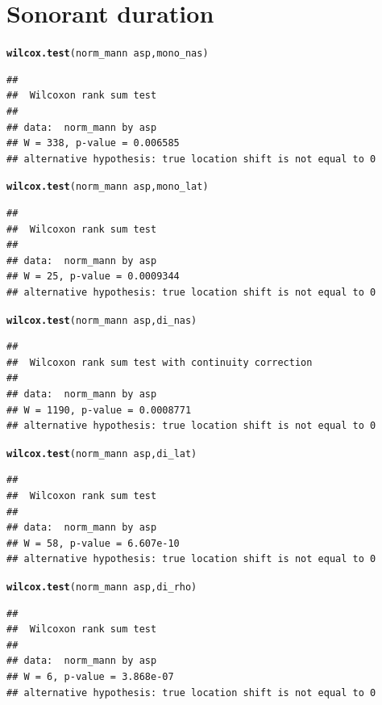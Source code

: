 \documentclass[a4paper,11pt]{article}\usepackage[]{graphicx}\usepackage[]{color}
\makeatletter
\newcommand{\hlopt}[1]{\textcolor[rgb]{0,0,0}{#1}}%
\newcommand{\hlstd}[1]{\textcolor[rgb]{0.345,0.345,0.345}{#1}}%
\newcommand{\hlkwd}[1]{\textcolor[rgb]{0.737,0.353,0.396}{\textbf{#1}}}%
\newenvironment{kframe}{%
 \def\at@end@of@kframe{}%
 \ifinner\ifhmode%
  \def\at@end@of@kframe{\end{minipage}}%
  \begin{minipage}{\columnwidth}%
 \fi\fi%
 \def\FrameCommand##1{\hskip\@totalleftmargin \hskip-\fboxsep
 \colorbox{shadecolor}{##1}\hskip-\fboxsep
     \hskip-\linewidth \hskip-\@totalleftmargin \hskip\columnwidth}%
 \MakeFramed {\advance\hsize-\width
   \@totalleftmargin\z@ \linewidth\hsize
   \@setminipage}}%
 {\par\unskip\endMakeFramed%
 \at@end@of@kframe}
\newenvironment{knitrout}{}{} %
\makeatother
\begin{document}
\section{Sonorant duration}
\begin{knitrout}
\color{fgcolor}\begin{kframe}
\begin{alltt}
\hlkwd{wilcox.test}\hlstd{(norm_mann} \hlopt{~} \hlstd{asp, mono_nas)}
\end{alltt}
\begin{verbatim}
## 
## 	Wilcoxon rank sum test
## 
## data:  norm_mann by asp
## W = 338, p-value = 0.006585
## alternative hypothesis: true location shift is not equal to 0
\end{verbatim}
\begin{alltt}
\hlkwd{wilcox.test}\hlstd{(norm_mann} \hlopt{~} \hlstd{asp, mono_lat)}
\end{alltt}
\begin{verbatim}
## 
## 	Wilcoxon rank sum test
## 
## data:  norm_mann by asp
## W = 25, p-value = 0.0009344
## alternative hypothesis: true location shift is not equal to 0
\end{verbatim}
\begin{alltt}
\hlkwd{wilcox.test}\hlstd{(norm_mann} \hlopt{~} \hlstd{asp, di_nas)}
\end{alltt}
\begin{verbatim}
## 
## 	Wilcoxon rank sum test with continuity correction
## 
## data:  norm_mann by asp
## W = 1190, p-value = 0.0008771
## alternative hypothesis: true location shift is not equal to 0
\end{verbatim}
\begin{alltt}
\hlkwd{wilcox.test}\hlstd{(norm_mann} \hlopt{~} \hlstd{asp, di_lat)}
\end{alltt}
\begin{verbatim}
## 
## 	Wilcoxon rank sum test
## 
## data:  norm_mann by asp
## W = 58, p-value = 6.607e-10
## alternative hypothesis: true location shift is not equal to 0
\end{verbatim}
\begin{alltt}
\hlkwd{wilcox.test}\hlstd{(norm_mann} \hlopt{~} \hlstd{asp, di_rho)}
\end{alltt}
\begin{verbatim}
## 
## 	Wilcoxon rank sum test
## 
## data:  norm_mann by asp
## W = 6, p-value = 3.868e-07
## alternative hypothesis: true location shift is not equal to 0
\end{verbatim}

\end{kframe}
\end{knitrout}
\end{document}

